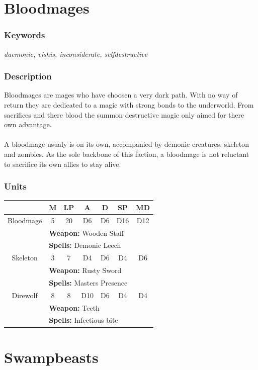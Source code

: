 \documentclass[a5paper,pagesize,10pt,bibtotoc,pointlessnumbers,
normalheadings,DIV=9,twoside=false]{scrbook}
\begin{document}
\section{Bloodmages}

\subsubsection{Keywords}
\emph{daemonic, vishis, inconsiderate, selfdestructive}

\subsubsection{Description}
Bloodmages are mages who have choosen a very dark path. With no way of return they are dedicated to a magic with strong bonds to the underworld.
From sacrifices and there blood the summon destructive magic only aimed for there own advantage.\\
\\
A bloodmage usualy is on its own, accompanied by demonic creatures, skeleton and zombies. As the sole backbone of this faction, a bloodmage is not reluctant to sacrifice its own allies to stay alive.

\subsubsection{Units}
 \begin{tabular}{||c c c c c c c||} 
 \hline
  & M & LP & A & D & SP & MD \\
 \hline\hline
 Bloodmage & 5 & 20 & D6 & D6 & D16 & D12 \\ 
  & \multicolumn{6}{l||}{\textbf{Weapon:} Wooden Staff} \\
  & \multicolumn{6}{l||}{\textbf{Spells:} Demonic Leech} \\
 \hline
 Skeleton & 3 & 7 & D4 & D6 & D4 & D6 \\
  & \multicolumn{6}{l||}{\textbf{Weapon:} Rusty Sword} \\
  & \multicolumn{6}{l||}{\textbf{Spells:} Masters Presence} \\
\hline
 Direwolf & 8 & 8 & D10 & D6 & D4 & D4 \\
  & \multicolumn{6}{l||}{\textbf{Weapon:} Teeth} \\
  & \multicolumn{6}{l||}{\textbf{Spells:} Infectious bite} \\
\hline
\end{tabular}

\section{Swampbeasts}
\end{document}
